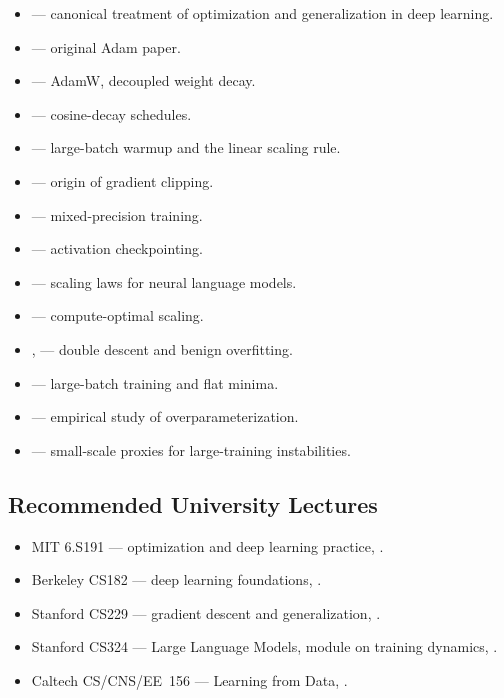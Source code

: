 \begin{itemize}
  \item \citet{goodfellow2016dl} — canonical treatment of optimization
        and generalization in deep learning.
  \item \citet{kingma2015adam} — original Adam paper.
  \item \citet{loshchilov2019decoupled} — AdamW, decoupled weight
        decay.
  \item \citet{loshchilov2017sgdr} — cosine-decay schedules.
  \item \citet{goyal2017accurate} — large-batch warmup and the linear
        scaling rule.
  \item \citet{pascanu2013difficulty} — origin of gradient clipping.
  \item \citet{micikevicius2018mixed} — mixed-precision training.
  \item \citet{chen2016training} — activation checkpointing.
  \item \citet{kaplan2020scaling} — scaling laws for neural language
        models.
  \item \citet{hoffmann2022chinchilla} — compute-optimal scaling.
  \item \citet{nakkiran2020double}, \citet{belkin2019reconciling} —
        double descent and benign overfitting.
  \item \citet{keskar2017large} — large-batch training and flat
        minima.
  \item \citet{zhang2017understanding} — empirical study of
        overparameterization.
  \item \citet{wortsman2023stable} — small-scale proxies for
        large-training instabilities.
\end{itemize}

\subsection{Recommended University Lectures}

\begin{itemize}
  \item MIT 6.S191 --- optimization and deep learning practice,
        \citet{mit_6s191}.
  \item Berkeley CS182 --- deep learning foundations,
        \citet{berkeley_cs182}.
  \item Stanford CS229 --- gradient descent and generalization,
        \citet{stanford_cs229}.
  \item Stanford CS324 --- Large Language Models, module on training
        dynamics, \citet{stanford_cs324}.
  \item Caltech CS/CNS/EE~156 --- Learning from Data,
        \citet{caltech_cs156}.
\end{itemize}

